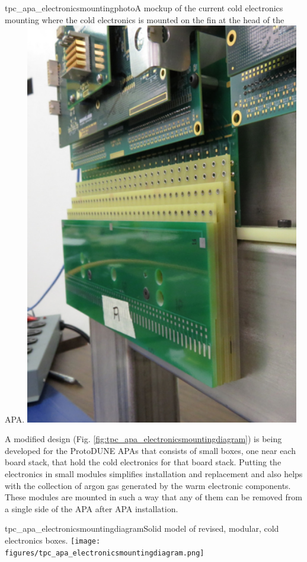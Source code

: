 \begin{cdrfigure}{tpc_apa_electronicsmountingphoto}{A mockup of the current cold electronics mounting where the cold electronics is mounted on the fin at the head of the APA.}
\includegraphics[width=0.9\textwidth]{figures/tpc_apa_electronicsmountingphoto.png} 
\end{cdrfigure}

A modified design (Fig. \ref{fig:tpc_apa_electronicsmountingdiagram}) is being developed for the ProtoDUNE APAs that consists of small boxes, one near each board stack, that hold the cold electronics for that board stack.  Putting the electronics in small modules simplifies installation and replacement and also helps with the collection of argon gas generated by the warm electronic components.  These modules are mounted in such a way that any of them can be removed from a single side of the APA after APA installation.

\begin{cdrfigure}{tpc_apa_electronicsmountingdiagram}{Solid model of revised, modular, cold electronics boxes.}
\texttt{[image: figures/tpc\_apa\_electronicsmountingdiagram.png]} 
\end{cdrfigure}

